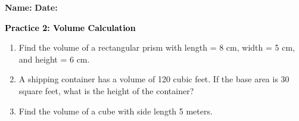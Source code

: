 \documentclass[12pt, letterpaper, fleqn]{article}
\begin{document}
\textbf{Name:} \underline{\hspace{5cm}}
\hfill
\textbf{Date:} \underline{\hspace{3cm}}\\

\begin{tcolorbox}[colback=customteal!20]
    \large\textcolor{black}{\textbf{Practice 2: Volume Calculation}}
\end{tcolorbox}
\begin{enumerate}[itemsep=3.5cm, leftmargin=0.6cm]
\item Find the volume of a rectangular prism with length = 8 cm, width = 5 cm, and height = 6 cm.
\vspace{3.5cm}
\item A shipping container has a volume of 120 cubic feet. If the base area is 30 square feet, what is the height of the container?
\vspace{3.5cm}
\item Find the volume of a cube with side length 5 meters.
\end{enumerate}
\end{document}
